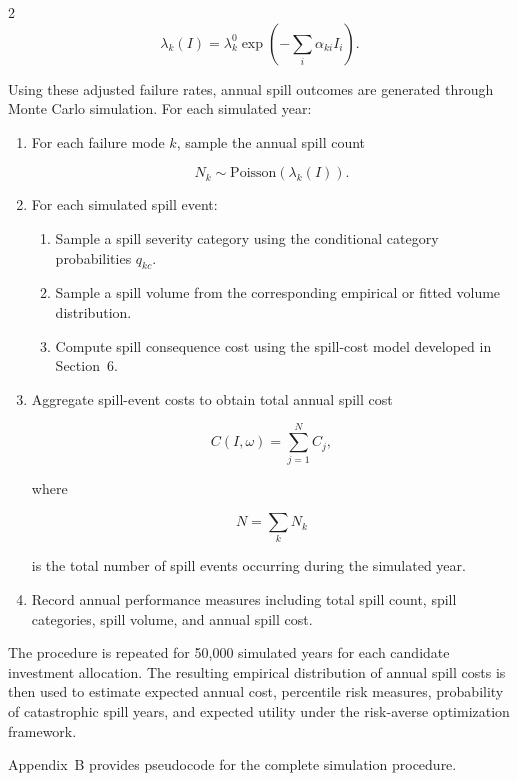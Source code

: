 \documentclass[10pt]{article}
\begin{document}
\begin{multicols}{2}
\[
\lambda_k(I)
=
\lambda_k^0
\exp
\left(
-\sum_i \alpha_{ki} I_i
\right).
\]

Using these adjusted failure rates, annual spill outcomes are generated
through Monte Carlo simulation. For each simulated year:

\begin{enumerate}[leftmargin=*]

\item For each failure mode $k$, sample the annual spill count

\[
N_k \sim \text{Poisson}(\lambda_k(I)).
\]

\item For each simulated spill event:

\begin{enumerate}

\item Sample a spill severity category using the conditional category probabilities $q_{kc}$.

\item Sample a spill volume from the corresponding empirical or fitted volume distribution.

\item Compute spill consequence cost using the spill-cost model developed in Section~6.

\end{enumerate}

\item Aggregate spill-event costs to obtain total annual spill cost

\[
C(I,\omega)
=
\sum_{j=1}^{N} C_j,
\]

where

\[
N=\sum_k N_k
\]

is the total number of spill events occurring during the simulated year.

\item Record annual performance measures including total spill count,
spill categories, spill volume, and annual spill cost.

\end{enumerate}

The procedure is repeated for 50{,}000 simulated years for each candidate
investment allocation. The resulting empirical distribution of annual
spill costs is then used to estimate expected annual cost, percentile
risk measures, probability of catastrophic spill years, and expected
utility under the risk-averse optimization framework.

Appendix~B provides pseudocode for the complete simulation procedure.


\end{multicols}
\end{document}
